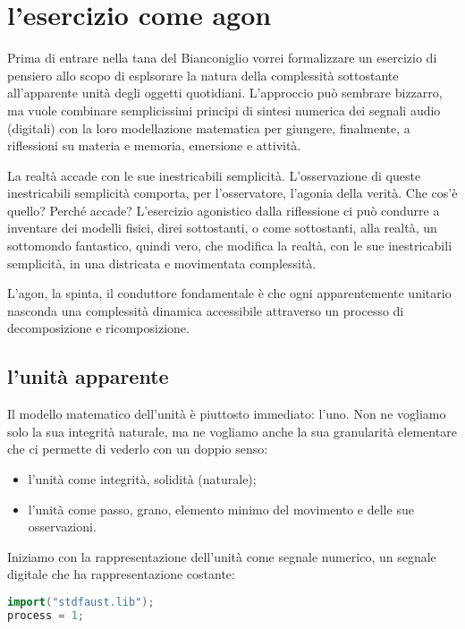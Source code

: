 \documentclass{gs-adonis}
\providecommand{\tightlist}{%
  \setlength{\itemsep}{0pt}\setlength{\parskip}{0pt}}
\begin{document}
\section{l'esercizio come agon}\label{lesercizio-come-agon}

Prima di entrare nella tana del Bianconiglio vorrei formalizzare un
esercizio di pensiero allo scopo di esplsorare la natura della
complessità sottostante all'apparente unità degli oggetti quotidiani.
L'approccio può sembrare bizzarro, ma vuole combinare semplicissimi
principi di sintesi numerica dei segnali audio (digitali) con la loro
modellazione matematica per giungere, finalmente, a riflessioni su
materia e memoria, emersione e attività.

La realtà accade con le sue inestricabili semplicità. L'osservazione di
queste inestricabili semplicità comporta, per l'osservatore, l'agonia
della verità. Che cos'è quello? Perché accade? L'esercizio agonistico
dalla riflessione ci può condurre a inventare dei modelli fisici, direi
sottostanti, o come sottostanti, alla realtà, un sottomondo fantastico,
quindi vero, che modifica la realtà, con le sue inestricabili
semplicità, in una districata e movimentata complessità.

L'agon, la spinta, il conduttore fondamentale è che ogni apparentemente
unitario nasconda una complessità dinamica accessibile attraverso un
processo di decomposizione e ricomposizione.

\subsection{l'unità apparente}\label{lunituxe0-apparente}

Il modello matematico dell'unità è piuttosto immediato: l'uno. Non ne
vogliamo solo la sua integrità naturale, ma ne vogliamo anche la sua
granularità elementare che ci permette di vederlo con un doppio senso:

\begin{itemize}
\tightlist
\item
  l'unità come integrità, solidità (naturale);
\item
  l'unità come passo, grano, elemento minimo del movimento e delle sue
  osservazioni.
\end{itemize}

Iniziamo con la rappresentazione dell'unità come segnale numerico, un
segnale digitale che ha rappresentazione costante:

\begin{lstlisting}[language={C++}]
import("stdfaust.lib");
process = 1;
\end{lstlisting}
\end{document}
